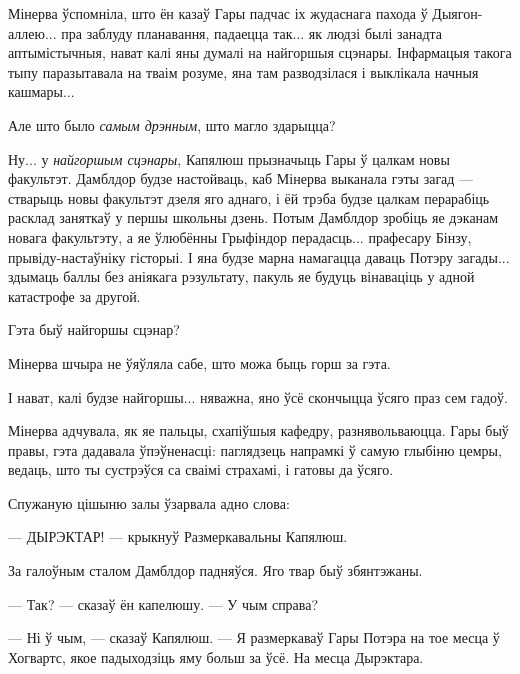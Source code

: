 Мінерва ўспомніла, што ён казаў Гары падчас іх жудаснага пахода ў Дыягон-аллею...
пра заблуду планавання, падаецца так... як людзі былі занадта аптымістычныя, нават
калі яны думалі на найгоршыя сцэнары. Інфармацыя такога тыпу паразытавала на тваім
розуме, яна там разводзілася і выклікала начныя кашмары...

Але што было \emph{самым дрэнным}, што магло здарыцца?

Ну... у \emph{найгоршым сцэнары}, Капялюш прызначыць Гары ў цалкам новы факультэт.
Дамблдор будзе настойваць, каб Мінерва выканала гэты загад --- стварыць новы факультэт
дзеля яго аднаго, і ёй трэба будзе цалкам перарабіць расклад заняткаў у першы школьны 
дзень. Потым Дамблдор зробіць яе дэканам новага факультэту, а яе ўлюбённы Грыфіндор 
перадасць... прафесару Бінзу, прывіду-настаўніку гісторыі. І яна будзе марна 
намагацца даваць Потэру загады... здымаць баллы без аніякага рэзультату, пакуль 
яе будуць вінаваціць у адной катастрофе за другой.

Гэта быў найгоршы сцэнар?

Мінерва шчыра не ўяўляла сабе, што можа быць горш за гэта.

І нават, калі будзе найгоршы... няважна, яно ўсё скончыцца ўсяго праз сем гадоў.

Мінерва адчувала, як яе пальцы, схапіўшыя кафедру, разнявольваюцца. 
Гары быў правы, гэта дадавала ўпэўненасці: паглядзець напрамкі ў самую
глыбіню цемры, ведаць, што ты сустрэўся са сваімі страхамі, і гатовы да ўсяго.

Спужаную цішыню залы ўзарвала адно слова:

--- ДЫРЭКТАР! ---  крыкнуў Размеркавальны Капялюш.

За галоўным сталом Дамблдор падняўся. Яго твар быў збянтэжаны.

--- Так? --- сказаў ён капелюшу. --- У чым справа?

--- Ні ў чым, --- сказаў Капялюш. --- Я размеркаваў Гары Потэра на тое месца
ў Хогвартс, якое падыходзіць яму больш за ўсё. На месца Дырэктара.
